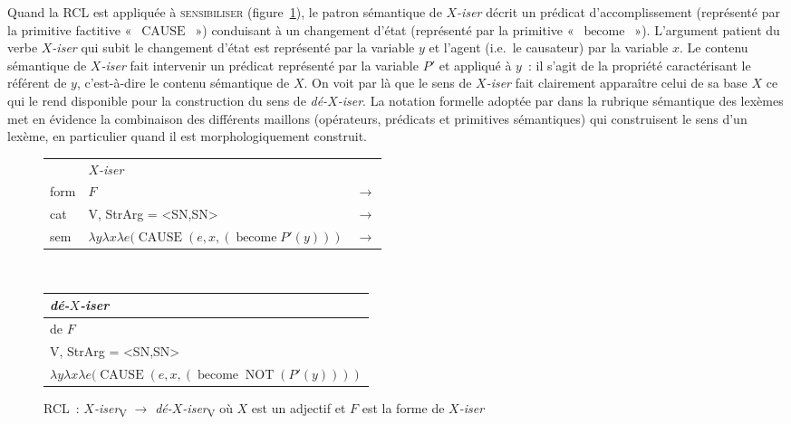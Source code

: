 \documentclass[output=paper]{langsci/langscibook}
\begin{document}
Quand la RCL est appliquée à \textsc{sensibiliser} (figure~\ref{fig:deXiser1}), le patron sémantique de  \emph{\mbox{$X$-iser}} décrit un prédicat d'accomplissement (représenté par la primitive factitive «~$\operatorname{CAUSE}$~») conduisant à un changement d'état (représenté par la primitive «~$\operatorname{become}$~»). L'argument patient du verbe \emph{\mbox{$X$-iser}} qui subit le changement d'état est représenté par la variable $y$ et l'agent (i.e.\ le causateur) par la variable $x$.  Le contenu sémantique de \emph{\mbox{$X$-iser}} fait intervenir un prédicat représenté par la variable $P'$ et appliqué à $y$~: il s'agit de la propriété caractérisant le référent de $y$,
 c'est-à-dire le contenu sémantique de $X$.  On voit par là que le sens de \emph{\mbox{$X$-iser}} fait clairement apparaître celui de sa base $X$ ce qui le rend disponible pour la construction du sens de \emph{\mbox{dé-$X$-iser}}.  La notation formelle adoptée par \citet{Fradin03}  dans la rubrique sémantique des lexèmes met en évidence la combinaison des différents maillons (opérateurs, prédicats et primitives sémantiques) qui construisent le sens d'un lexème, en particulier quand il est morphologiquement construit.

\begin{figure}
\begin{tabular}[t]{l|l|l}
\multicolumn{1}{l}{} & \multicolumn{1}{l}{\emph{$X$-iser}}\\
\cline{2-2}
form & $F$ &  $\rightarrow$\\
\cline{2-2}
cat & V, StrArg = <SN,SN> &  $\rightarrow$\\
\cline{2-2}
sem & $\lambda y \lambda x \lambda e (\operatorname{CAUSE} (e, x, (\operatorname{become} P'(y)))$ & $\rightarrow$\\
\cline{2-2}
\end{tabular}\\
\mbox{}\hfill%
\begin{tabular}[t]{|l|}
 \multicolumn{1}{l}{\emph{dé-$X$-iser}}\\
\hline
de%
$F$\\
\hline
V, StrArg = <SN,SN>\\
\hline
$\lambda y \lambda x \lambda e (\operatorname{CAUSE} (e, x, (\operatorname{become} \operatorname{NOT}(P'(y))))$\\
\hline
\end{tabular}

\caption{RCL~: \emph{\mbox{\protect$X$-iser}}\textsubscript{V}  \protect$\rightarrow$ \emph{\mbox{dé-\protect$X$-iser}}\textsubscript{V} où \protect$X$ est un adjectif et \protect$F$ est la forme de \emph{\mbox{\protect$X$-iser}}}
\label{fig:deXiser1}
\end{figure}
\end{document}
